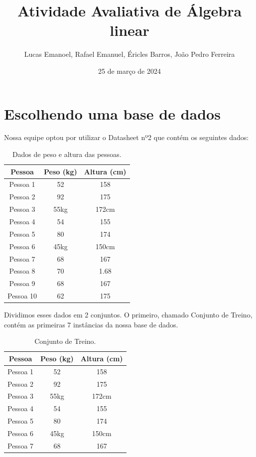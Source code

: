 \documentclass{article}
\title{Atividade Avaliativa de Álgebra linear}
\author{Lucas Emanoel, Rafael Emanuel, Éricles Barros, João Pedro Ferreira}
\date{25 de março de 2024}
\begin{document}
\maketitle


\section{Escolhendo uma base de dados}
    Nossa equipe optou por utilizar o Datasheet nº2 que contém os seguintes dados:
    
    \begin{table}[ht]
        \centering
        \begin{tabular}{|c|c|c|}
        \hline
        \textbf{Pessoa} & \textbf{Peso (kg)} & \textbf{Altura (cm)} \\
        \hline
            Pessoa 1 & 52 & 158 \\
        \hline
            Pessoa 2 & 92 & 175 \\
        \hline
            Pessoa 3 & 55kg & 172cm \\
        \hline
            Pessoa 4 & 54 & 155 \\
        \hline
            Pessoa 5 & 80 & 174 \\
        \hline
            Pessoa 6 & 45kg & 150cm \\
        \hline
            Pessoa 7 & 68 & 167 \\
        \hline
            Pessoa 8 & 70 & 1.68 \\
        \hline
            Pessoa 9 & 68 & 167 \\
        \hline
            Pessoa 10 & 62 & 175 \\
        \hline
        \end{tabular}
        \caption{Dados de peso e altura das pessoas.}
        \label{tab:dados}
    \end{table}
    
    Dividimos esses dados em 2 conjuntos. O primeiro, chamado Conjunto de Treino, contém as primeiras 7 instâncias da nossa base de dados.
    
    \begin{table}[ht]
        \centering
        \begin{tabular}{|c|c|c|}
        \hline
        \textbf{Pessoa} & \textbf{Peso (kg)} & \textbf{Altura (cm)} \\
        \hline
            Pessoa 1 & 52 & 158 \\
        \hline
            Pessoa 2 & 92 & 175 \\
        \hline
            Pessoa 3 & 55kg & 172cm \\
        \hline
            Pessoa 4 & 54 & 155 \\
        \hline
            Pessoa 5 & 80 & 174 \\
        \hline
            Pessoa 6 & 45kg & 150cm \\
        \hline
            Pessoa 7 & 68 & 167 \\
        \hline
        \end{tabular}
        \caption{Conjunto de Treino.}
        \label{tab:treino}
    \end{table}
    
\end{document}
